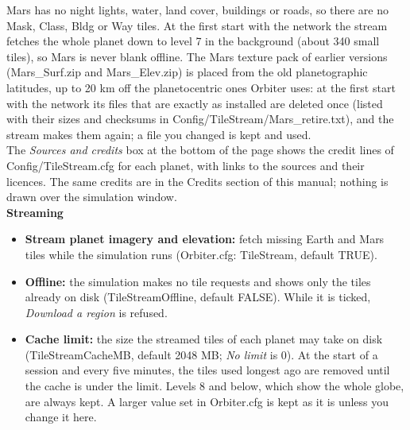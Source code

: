 \documentclass[Orbiter User Manual.tex]{subfiles}
\begin{document}
Mars has no night lights, water, land cover, buildings or roads, so there are no Mask, Class, Bldg or Way tiles. At the first start with the network the stream fetches the whole planet down to level 7 in the background (about 340 small tiles), so Mars is never blank offline. The Mars texture pack of earlier versions (Mars\_Surf.zip and Mars\_Elev.zip) is placed from the old planetographic latitudes, up to 20 km off the planetocentric ones Orbiter uses: at the first start with the network its files that are exactly as installed are deleted once (listed with their sizes and checksums in Config/TileStream/Mars\_retire.txt), and the stream makes them again; a file you changed is kept and used.\\
The \textit{Sources and credits} box at the bottom of the page shows the credit lines of Config/TileStream.cfg for each planet, with links to the sources and their licences. The same credits are in the Credits section of this manual; nothing is drawn over the simulation window.\\

\noindent
\textbf{Streaming}
\begin{itemize}
\item \textbf{Stream planet imagery and elevation:} fetch missing Earth and Mars tiles while the simulation runs (Orbiter.cfg: TileStream, default TRUE).
\item \textbf{Offline:} the simulation makes no tile requests and shows only the tiles already on disk (TileStreamOffline, default FALSE). While it is ticked, \textit{Download a region} is refused.
\item \textbf{Cache limit:} the size the streamed tiles of each planet may take on disk (TileStreamCacheMB, default 2048 MB; \textit{No limit} is 0). At the start of a session and every five minutes, the tiles used longest ago are removed until the cache is under the limit. Levels 8 and below, which show the whole globe, are always kept. A larger value set in Orbiter.cfg is kept as it is unless you change it here.
\end{itemize}
\end{document}
